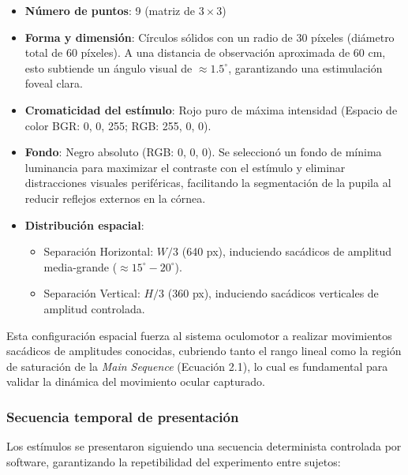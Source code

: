 \begin{itemize}
	\item \textbf{Número de puntos}: 9 (matriz de $3 \times 3$)
	\item \textbf{Forma y dimensión}: Círculos sólidos con un radio de 30 píxeles (diámetro total de 60 píxeles).
	A una distancia de observación aproximada de 60 cm, esto subtiende un ángulo visual de $\approx 1.5^\circ$, garantizando una estimulación foveal clara.
	\item \textbf{Cromaticidad del estímulo}: Rojo puro de máxima intensidad (Espacio de color BGR: 0, 0, 255; RGB: 255, 0, 0).
	\item \textbf{Fondo}: Negro absoluto (RGB: 0, 0, 0). Se seleccionó un fondo de mínima luminancia para maximizar el contraste con el estímulo y eliminar distracciones visuales periféricas, facilitando la segmentación de la pupila al reducir reflejos externos en la córnea.
	\item \textbf{Distribución espacial}: 
	\begin{itemize}
		\item Separación Horizontal: $W/3$ (640 px), induciendo sacádicos de amplitud media-grande ($\approx 15^\circ - 20^\circ$).
		\item Separación Vertical: $H/3$ (360 px), induciendo sacádicos verticales de amplitud controlada.
	\end{itemize}
\end{itemize}

Esta configuración espacial fuerza al sistema oculomotor a realizar movimientos sacádicos de amplitudes conocidas, cubriendo tanto el rango lineal como la región de saturación de la \textit{Main Sequence} (Ecuación 2.1), lo cual es fundamental para validar la dinámica del movimiento ocular capturado.

\subsubsection{Secuencia temporal de presentación}

Los estímulos se presentaron siguiendo una secuencia determinista controlada por software, garantizando la repetibilidad del experimento entre sujetos:


